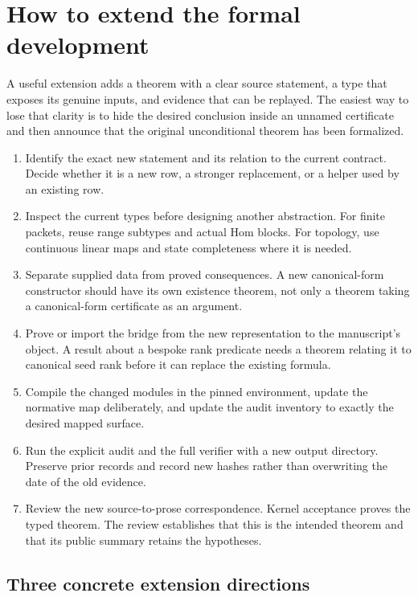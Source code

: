 \documentclass[11pt,a4paper]{article}
\begin{document}
\section{How to extend the formal development}

A useful extension adds a theorem with a clear source statement, a type that exposes its genuine inputs, and evidence that can be replayed. The easiest way to lose that clarity is to hide the desired conclusion inside an unnamed certificate and then announce that the original unconditional theorem has been formalized.

\begin{enumerate}
\item Identify the exact new statement and its relation to the current contract. Decide whether it is a new row, a stronger replacement, or a helper used by an existing row.
\item Inspect the current types before designing another abstraction. For finite packets, reuse range subtypes and actual Hom blocks. For topology, use continuous linear maps and state completeness where it is needed.
\item Separate supplied data from proved consequences. A new canonical-form constructor should have its own existence theorem, not only a theorem taking a canonical-form certificate as an argument.
\item Prove or import the bridge from the new representation to the manuscript's object. A result about a bespoke rank predicate needs a theorem relating it to canonical seed rank before it can replace the existing formula.
\item Compile the changed modules in the pinned environment, update the normative map deliberately, and update the audit inventory to exactly the desired mapped surface.
\item Run the explicit audit and the full verifier with a new output directory. Preserve prior records and record new hashes rather than overwriting the date of the old evidence.
\item Review the new source-to-prose correspondence. Kernel acceptance proves the typed theorem. The review establishes that this is the intended theorem and that its public summary retains the hypotheses.
\end{enumerate}

\subsection{Three concrete extension directions}
\end{document}
